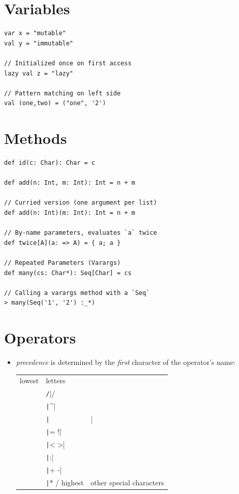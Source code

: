 \documentclass[10pt,landscape,a4paper]{article}
\begin{document}

\small
\begin{multicols*}{4}

  \section{Variables}
\begin{verbatim}
var x = "mutable"
val y = "immutable"

// Initialized once on first access
lazy val z = "lazy"

// Pattern matching on left side
val (one,two) = ("one", '2')
\end{verbatim}

  \section{Methods}
\begin{verbatim}
def id(c: Char): Char = c

def add(n: Int, m: Int): Int = n + m

// Curried version (one argument per list)
def add(n: Int)(m: Int): Int = n + m

// By-name parameters, evaluates `a` twice
def twice[A](a: => A) = { a; a }

// Repeated Parameters (Varargs)
def many(cs: Char*): Seq[Char] = cs

// Calling a varargs method with a `Seq`
> many(Seq('1', '2') :_*)
\end{verbatim}

  \section{Operators}
  \begin{itemize}
  \item \textit{precedence} is determined by the \textit{first} character of the
    operator's name:

    \begin{tabular}{l | l}
      lowest & letters \\
             & \texttt/|/ \\
             & \texttt|^| \\
             & \texttt|&| \\
             & \texttt|= !| \\
             & \texttt|< >| \\
             & \texttt|:| \\
             & \texttt|+ -| \\
             & \texttt|* / %
      highest & other special characters


\end{tabular}
\end{itemize}
\end{multicols*}
\end{document}
